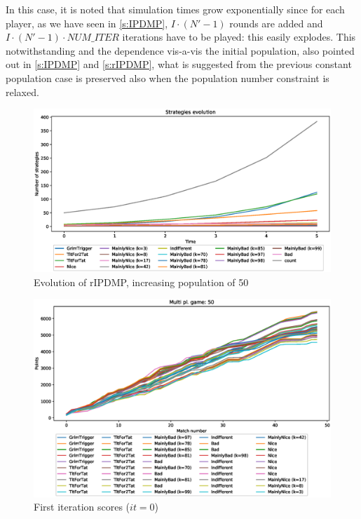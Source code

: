 \documentclass[journal,10pt,twoside]{IEEEtran}
\begin{document}
In this case, it is noted that simulation times grow exponentially since for each player, as we have seen in \autoref{s:IPDMP}, $I\cdot(N'-1)$ rounds are added and $I\cdot(N'-1)\cdot{NUM\_ITER}$ iterations have to be played: this easily explodes. This notwithstanding and the dependence vis-a-vis the initial population, also pointed out in \autoref{s:IPDMP} and \autoref{s:rIPDMP}, what is suggested from the previous constant population case is preserved also when the population number constraint is relaxed.

\begin{figure}[!ht]
    \centering
    \includegraphics[width=1\columnwidth]{../img/ripdmp-incr/ripdmp-evolution-increasing-pop-50}
    \caption{Evolution of rIPDMP, increasing population of 50}
    \label{fig:incrR}
\end{figure}

\begin{figure}[!ht]
    \centering
    \includegraphics[width=1\columnwidth]{../img/ripdmp-incr/ripdmp-scores-increasing-pop-50-r0}
    \caption{First iteration scores ($it=0$)}
    \label{fig:incrFI}
\end{figure}
\end{document}

